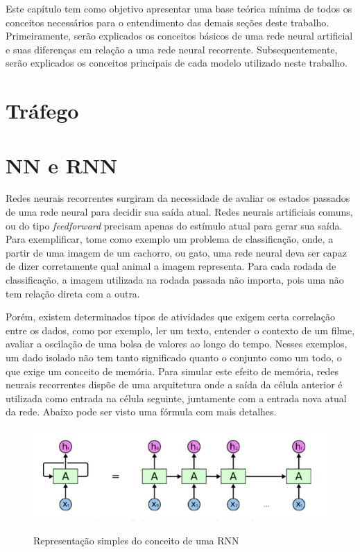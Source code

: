 Este capítulo tem como objetivo apresentar uma base teórica mínima de todos os conceitos necessários para o entendimento das demais seções deste trabalho. Primeiramente, serão explicados os conceitos básicos de uma rede neural artificial e suas diferenças em relação a uma rede neural recorrente. Subsequentemente, serão explicados os conceitos principais de cada modelo utilizado neste trabalho.
\section{Tráfego}


\section{\acrfull{NN} e \acrfull{RNN}}

Redes neurais recorrentes surgiram da necessidade de avaliar os estados passados de uma rede neural para decidir sua saída atual. Redes neurais artificiais comuns, ou do tipo \textit{feedforward} precisam apenas do estímulo atual para gerar sua saída. Para exemplificar, tome como exemplo um problema de classificação, onde, a partir de uma imagem de um cachorro, ou gato, uma rede neural deva ser capaz de dizer corretamente qual animal a imagem representa. Para cada rodada de classificação, a imagem utilizada na rodada passada não importa, pois uma não tem relação direta com a outra. 

Porém, existem determinados tipos de atividades que exigem certa correlação entre os dados, como por exemplo, ler um texto, entender o contexto de um filme, avaliar a oscilação de uma bolsa de valores ao longo do tempo. Nesses exemplos, um dado isolado não tem tanto significado quanto o conjunto como um todo, o que exige um conceito de memória. Para simular este efeito de memória, redes neurais recorrentes dispõe de uma arquitetura onde a saída da célula anterior é utilizada como entrada na célula seguinte, juntamente com a entrada nova atual da rede. Abaixo pode ser visto uma fórmula com mais detalhes.

\begin{figure}[htb]
    \centering
    \includegraphics[scale=0.4]{rnnExample.png}
    \label{figure:eixo}
    \caption[Representação simples do conceito de um RNN]{Representação simples do conceito de uma RNN \footnotemark}
\end{figure}

